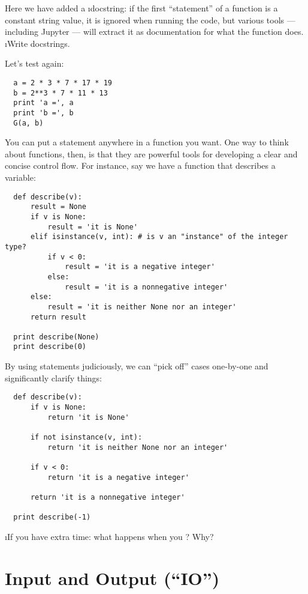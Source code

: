 \documentclass[letterpaper, 12pt, titlepage, twoside]{article}
\begin{document}
Here we have added a \i{docstring}: if the first ``statement'' of a function
is a constant string value, it is ignored when running the code, but various
tools --- including Jupyter --- will extract it as documentation for what the
function does. \i{Write docstrings.}

Let's test again:

\begin{lstlisting}
  a = 2 * 3 * 7 * 17 * 19
  b = 2**3 * 7 * 11 * 13
  print 'a =', a
  print 'b =', b
  G(a, b)
\end{lstlisting}

You can put a  statement anywhere in a function you want. One way to
think about functions, then, is that they are powerful tools for developing a
clear and concise control flow. For instance, say we have a function that
describes a variable:

\begin{lstlisting}
  def describe(v):
      result = None
      if v is None:
          result = 'it is None'
      elif isinstance(v, int): # is v an "instance" of the integer type?
          if v < 0:
              result = 'it is a negative integer'
          else:
              result = 'it is a nonnegative integer'
      else:
          result = 'it is neither None nor an integer'
      return result

  print describe(None)
  print describe(0)
\end{lstlisting}

By using  statements judiciously, we can ``pick off'' cases
one-by-one and significantly clarify things:

\begin{lstlisting}
  def describe(v):
      if v is None:
          return 'it is None'

      if not isinstance(v, int):
          return 'it is neither None nor an integer'

      if v < 0:
          return 'it is a negative integer'

      return 'it is a nonnegative integer'

  print describe(-1)
\end{lstlisting}

\i{If you have extra time:} what happens when you ? Why?


\newpage
\section{Input and Output (``IO'')}
\end{document}
